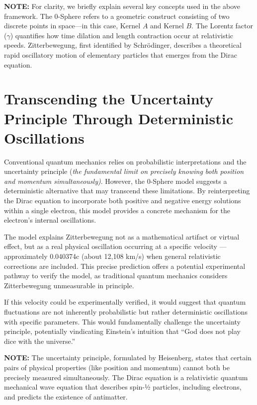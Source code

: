 \documentclass[12pt,letterpaper]{article} %
\begin{document}
\vspace{0.5cm}
\noindent\textbf{NOTE:} For clarity, we briefly explain several key concepts used in the above framework. The 0-Sphere refers to a geometric construct consisting of two discrete points in space—in this case, Kernel $A$ and Kernel $B$. The Lorentz factor ($\gamma$) quantifies how time dilation and length contraction occur at relativistic speeds. Zitterbewegung, first identified by Schrödinger, describes a theoretical rapid oscillatory motion of elementary particles that emerges from the Dirac equation.

\section{Transcending the Uncertainty Principle Through Deterministic Oscillations}

Conventional quantum mechanics relies on probabilistic interpretations and the uncertainty principle (\textit{the fundamental limit on precisely knowing both position and momentum simultaneously)}. However, the 0-Sphere model suggests a deterministic alternative that may transcend these limitations\cite{bohm1952}. By reinterpreting the Dirac equation to incorporate both positive and negative energy solutions within a single electron, this model provides a concrete mechanism for the electron's internal oscillations.

The model explains Zitterbewegung not as a mathematical artifact or virtual effect, but as a real physical oscillation occurring at a specific velocity --- approximately 0.040374c (about 12,108 km/s) when general relativistic corrections are included\cite{hanamura2025}. This precise prediction offers a potential experimental pathway to verify the model, as traditional quantum mechanics considers Zitterbewegung unmeasurable in principle.

If this velocity could be experimentally verified, it would suggest that quantum fluctuations are not inherently probabilistic but rather deterministic oscillations with specific parameters. This would fundamentally challenge the uncertainty principle, potentially vindicating Einstein's intuition that ``God does not play dice with the universe.''

\vspace{0.5cm}
\noindent\textbf{NOTE:} The uncertainty principle, formulated by Heisenberg, states that certain pairs of physical properties (like position and momentum) cannot both be precisely measured simultaneously. The Dirac equation is a relativistic quantum mechanical wave equation that describes spin-½ particles, including electrons, and predicts the existence of antimatter.
\end{document}
